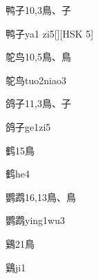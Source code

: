 \begin{entry}{鸭子}{10,3}{⿃、⼦}
  \begin{phonetics}{鸭子}{ya1 zi5}[][HSK 5]
  \end{phonetics}
\end{entry}

\begin{entry}{鸵鸟}{10,5}{⿃、⿃}
  \begin{phonetics}{鸵鸟}{tuo2niao3}
  \end{phonetics}
\end{entry}

\begin{entry}{鸽子}{11,3}{⿃、⼦}
  \begin{phonetics}{鸽子}{ge1zi5}
  \end{phonetics}
\end{entry}

\begin{entry}{鹤}{15}{⿃}
  \begin{phonetics}{鹤}{he4}
  \end{phonetics}
\end{entry}

\begin{entry}{鹦鹉}{16,13}{⿃、⿃}
  \begin{phonetics}{鹦鹉}{ying1wu3}
  \end{phonetics}
\end{entry}

\begin{entry}{鷄}{21}{⿃}
  \begin{phonetics}{鷄}{ji1}
  \end{phonetics}
\end{entry}


